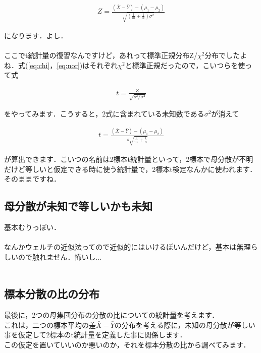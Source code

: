 \documentclass[11pt,a4paper,uplatex]{ujreport} 	%
\begin{document}
\begin{align}
  Z= \frac{(\bar{X}- \bar{Y}) - (\mu_1 - \mu_2)}{\sqrt{(\frac{1}{m} + \frac{1}{n})\sigma^2}}
  \label{eq:nor}
\end{align}

になります．よし．\\
\\

ここでt統計量の復習なんですけど，あれって標準正規分布Z/$\chi^2$分布でしたよね．式(\ref{eq:chi}，\ref{eq:nor})はそれぞれ$\chi^2$と標準正規だったので，こいつらを使って式

\begin{align}
  t = \frac{Z}{\sqrt{s^2/\sigma^2}}
\end{align}

をやってみます．こうすると，2式に含まれている未知数である$\sigma^2$が消えて

\begin{align}
  t = \frac{(\bar{X}- \bar{Y}) - (\mu_1 - \mu_2)}{s\sqrt{\frac{1}{m} + \frac{1}{n}}}
\end{align}

が算出できます．こいつの名前は2標本t統計量といって，2標本で母分散が不明だけど等しいと仮定できる時に使う統計量で，2標本t検定なんかに使われます．そのままですね．





\subsection{母分散が未知で等しいかも未知}
基本むりっぽい．\\
\\

なんかウェルチの近似法ってので近似的にはいけるぽいんだけど，基本は無理らしいので触れません．怖いし...\\\\

\subsection{標本分散の比の分布}
最後に，2つの母集団分布の分散の比についての統計量を考えます．\\

これは，二つの標本平均の差$\bar{X}-\bar{Y}$の分布を考える際に，未知の母分散が等しい事を仮定して2標本のt統計量を定義した事に関係します．\\

この仮定を置いていいのか悪いのか，それを標本分散の比から調べてみます．
\end{document}
